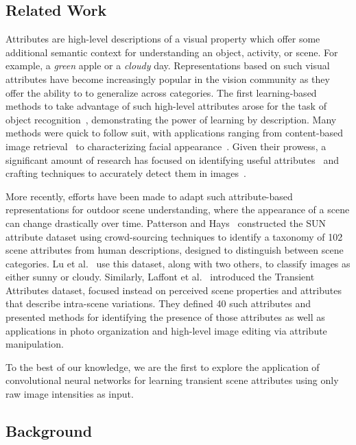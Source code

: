 \documentclass[10pt,twocolumn,letterpaper]{article}
\begin{document}
\subsection{Related Work}
Attributes are high-level descriptions of a visual property which offer some
additional semantic context for understanding an object, activity, or scene.
For example, a \emph{green} apple or a \emph{cloudy} day. Representations based
on such visual attributes have become increasingly popular in the vision
community as they offer the ability to to generalize across categories. The
first learning-based methods to take advantage of such high-level attributes
arose for the task of object
recognition~\cite{farhadi2009describing,lampert2009learning}, demonstrating the
power of learning by description. Many methods were quick to follow suit, with
applications ranging from content-based image
retrieval~\cite{siddiquie2011image} to characterizing facial
appearance~\cite{kumar2011describable}. Given their prowess, a significant
amount of research has focused on identifying useful
attributes~\cite{berg2010automatic} and crafting techniques to accurately
detect them in images~\cite{vedaldi2014understanding}. 

More recently, efforts have been made to adapt such attribute-based
representations for outdoor scene understanding, where the appearance of a
scene can change drastically over time.  Patterson and
Hays~\cite{patterson2012sun} constructed the SUN attribute dataset using
crowd-sourcing techniques to identify a taxonomy of 102 scene attributes from
human descriptions, designed to distinguish between scene categories. Lu et
al.~\cite{lutwoclass} use this dataset, along with two others, to classify
images as either sunny or cloudy.  Similarly, Laffont et al.~\cite{Laffont14}
introduced the Transient Attributes dataset, focused instead on perceived scene
properties and attributes that describe intra-scene variations. They defined 40
such attributes and presented methods for identifying the presence of those
attributes as well as applications in photo organization and high-level image
editing via attribute manipulation. 

To the best of our knowledge, we are the first to explore the application of
convolutional neural networks for learning transient scene attributes
using only raw image intensities as input.

\subsection{Background}
\end{document}
